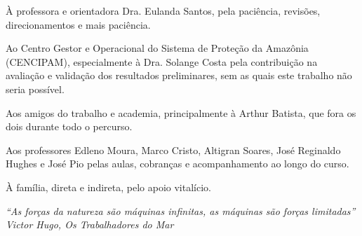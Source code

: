\begin{agradecimentos}
	À professora e orientadora Dra. Eulanda Santos, pela paciência, revisões, direcionamentos e mais paciência.

	Ao Centro Gestor e Operacional do Sistema de Proteção da Amazônia (CENCIPAM), especialmente à Dra. Solange Costa pela contribuição na avaliação e validação dos resultados preliminares, sem as quais este trabalho não seria possível.

	Aos amigos do trabalho e academia, principalmente à Arthur Batista, que fora os dois durante todo o percurso.

	Aos professores Edleno Moura, Marco Cristo, Altigran Soares, José Reginaldo Hughes e José Pio pelas aulas, cobranças e acompanhamento ao longo do curso.

	À família, direta e indireta, pelo apoio vitalício.

\end{agradecimentos}

\begin{epigrafe}
	\vspace*{\fill}
	\begin{flushright}
		\textit{``As forças da natureza são máquinas infinitas, as máquinas são forças limitadas''\\Victor Hugo, Os Trabalhadores do Mar}
	\end{flushright}
\end{epigrafe}

\tableofcontents*
\clearpage

\listoffigures
\clearpage

\listoftables
\clearpage

